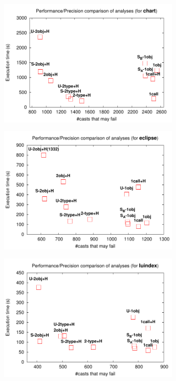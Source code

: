 \begin{figure}[tbp]
\begin{center}
\begin{subfigure}[b]{0.45\textwidth}
\end{subfigure}
\begin{subfigure}[b]{0.45\textwidth}
\includegraphics[width=\textwidth]{assets/hybrid/chart.pdf}
\end{subfigure}\hspace{1cm}%
\begin{subfigure}[b]{0.45\textwidth}
\includegraphics[width=\textwidth]{assets/hybrid/eclipse.pdf}
\end{subfigure}
\begin{subfigure}[b]{0.45\textwidth}
\includegraphics[width=\textwidth]{assets/hybrid/luindex.pdf}

\end{subfigure}
\end{center}
\end{figure}
